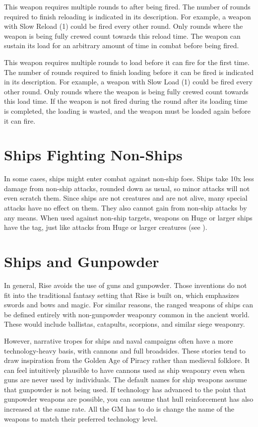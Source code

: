          This weapon requires multiple rounds to after being fired.
        The number of rounds required to finish reloading is indicated in its description.
        For example, a weapon with Slow Reload (1) could be fired every other round.
        Only rounds where the weapon is being fully crewed count towards this reload time.
        The weapon can sustain its load for an arbitrary amount of time in combat before being fired.

         This weapon requires multiple rounds to load before it can fire for the first time.
        The number of rounds required to finish loading before it can be fired is indicated in its description.
        For example, a weapon with Slow Load (1) could be fired every other round.
        Only rounds where the weapon is being fully crewed count towards this load time.
        If the weapon is not fired during the round after its loading time is completed, the loading is wasted, and the weapon must be loaded again before it can fire.

\section{Ships Fighting Non-Ships}
    In some cases, ships might enter combat against non-ship foes.
    Ships take 10x less damage from non-ship attacks, rounded down as usual, so minor attacks will not even scratch them.
    Since ships are not creatures and are not alive, many special attacks have no effect on them.
    They also cannot gain  from non-ship attacks by any means.
    When used against non-ship targets, weapons on Huge or larger ships have the  tag, just like attacks from Huge or larger creatures (see ).

\section{Ships and Gunpowder}
    In general, Rise avoids the use of guns and gunpowder.
    Those inventions do not fit into the traditional fantasy setting that Rise is built on, which emphasizes swords and bows and magic.
    For similar reasons, the ranged weapons of ships can be defined entirely with non-gunpowder weaponry common in the ancient world.
    These would include ballistas, catapults, scorpions, and similar siege weaponry.

    However, narrative tropes for ships and naval campaigns often have a more technology-heavy basis, with cannons and full broadsides.
    These stories tend to draw inspiration from the Golden Age of Piracy rather than medieval folklore.
    It can feel intuitively plausible to have cannons used as ship weaponry even when guns are never used by individuals.
    The default names for ship weapons assume that gunpowder is not being used.
    If technology has advanced to the point that gunpowder weapons are possible, you can assume that hull reinforcement has also increased at the same rate.
    All the GM has to do is change the name of the weapons to match their preferred technology level.
